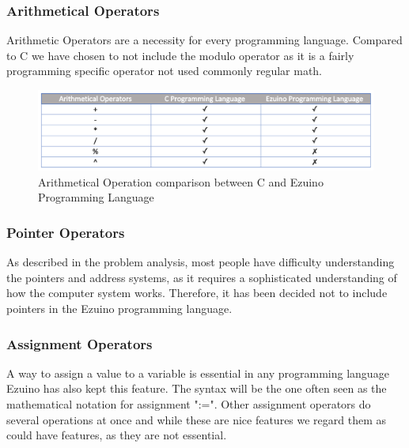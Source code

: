 \subsubsection*{Arithmetical Operators}
Arithmetic Operators are a necessity for every programming language. 
Compared to C we have chosen to not include the modulo operator as it is a fairly programming specific operator not used commonly regular math.  
\begin{figure}[H]
\centering
\includegraphics[scale=0.60]{figures/language_features/langf05.png}
\caption{Arithmetical Operation comparison between C and Ezuino Programming Language}
\label{lf05}
\end{figure}

\subsubsection*{Pointer Operators}
As described in the problem analysis, most people have difficulty understanding the pointers and address systems, as it requires a sophisticated understanding of how the computer system works. Therefore, it has been decided not to include pointers in the Ezuino programming language. 
\subsubsection*{Assignment Operators}
A way to assign a value to a variable is essential in any programming language Ezuino has also kept this feature. The syntax will be the one often seen as the mathematical notation for assignment ":=". Other assignment operators do several operations at once and while these are nice features we regard them as could have features, as they are not essential.
